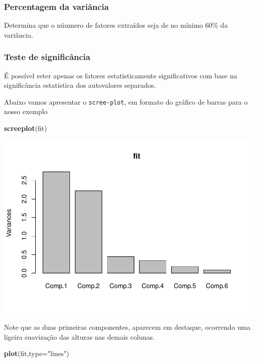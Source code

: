 \documentclass[12pt,brazil,]{book}
\newenvironment{Shaded}{\begin{snugshade}}{\end{snugshade}}
\newcommand{\DataTypeTok}[1]{\textcolor[rgb]{0.13,0.29,0.53}{#1}}
\newcommand{\KeywordTok}[1]{\textcolor[rgb]{0.13,0.29,0.53}{\textbf{#1}}}
\newcommand{\NormalTok}[1]{#1}
\newcommand{\StringTok}[1]{\textcolor[rgb]{0.31,0.60,0.02}{#1}}
\begin{document}
\hypertarget{percentagem-da-variancia}{%
\subsubsection{Percentagem da
variância}\label{percentagem-da-variancia}}

Determina que o núumero de fatores extraídos seja de no mínimo 60\% da
variância.

\hypertarget{teste-de-significancia}{%
\subsubsection{Teste de significância}\label{teste-de-significancia}}

É possível reter apenas os fatores estatisticamente significativos com
base na significância estatística dos autovalores separados.

Abaixo vamos apresentar o \texttt{scree-plot}, em formato do gráfico de
barras para o nosso exemplo

\begin{Shaded}
\begin{Highlighting}[]
\KeywordTok{screeplot}\NormalTok{(fit)}
\end{Highlighting}
\end{Shaded}

\includegraphics{03-AnaliseFat_files/figure-latex/unnamed-chunk-7-1.pdf}

Note que as duas primeiras componentes, aparecem em destaque, ocorrendo
uma ligeira suavização das alturas nas demais colunas.

\begin{Shaded}
\begin{Highlighting}[]
\KeywordTok{plot}\NormalTok{(fit,}\DataTypeTok{type=}\StringTok{"lines"}\NormalTok{)}
\end{Highlighting}
\end{Shaded}
\end{document}
